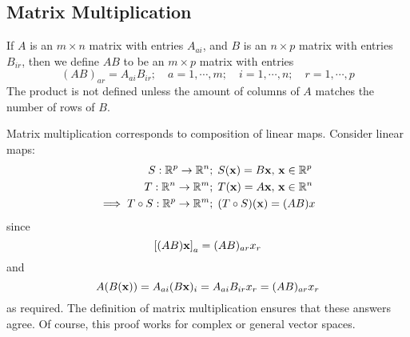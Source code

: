 \documentclass{article}
\begin{document}
\subsection{Matrix Multiplication}
If $A$ is an $m\times n$ matrix with entries $A_{ai}$, and $B$ is an $n \times p$ matrix with entries $B_{ir}$, then we define $AB$ to be an $m \times p$ matrix with entries
\[ (AB)_{ar} = A_{ai}B_{ir};\quad a = 1, \cdots, m;\quad i = 1, \cdots, n;\quad r = 1, \cdots, p \]
The product is not defined unless the amount of columns of $A$ matches the number of rows of $B$.

Matrix multiplication corresponds to composition of linear maps. Consider linear maps:
\begin{align*}
	S: \mathbb R^p \to \mathbb R^n                  & ;\; S(\vb x) = B \vb x,\, \vb x \in \mathbb R^p \\
	T: \mathbb R^n \to \mathbb R^m                  & ;\; T(\vb x) = A \vb x,\, \vb x \in \mathbb R^n \\
	\implies T \circ S: \mathbb R^p \to \mathbb R^m & ;\; (T\circ S)(\vb x) = (AB)x
\end{align*}
since
\[ \left[ (AB)\vb x \right]_a = (AB)_{ar}x_r \]
and
\[ A(B(\vb x)) = A_{ai} (B\vb x)_i = A_{ai} B_{ir} x_r = (AB)_{ar}x_r \]
as required. The definition of matrix multiplication ensures that these answers agree. Of course, this proof works for complex or general vector spaces.
\end{document}
